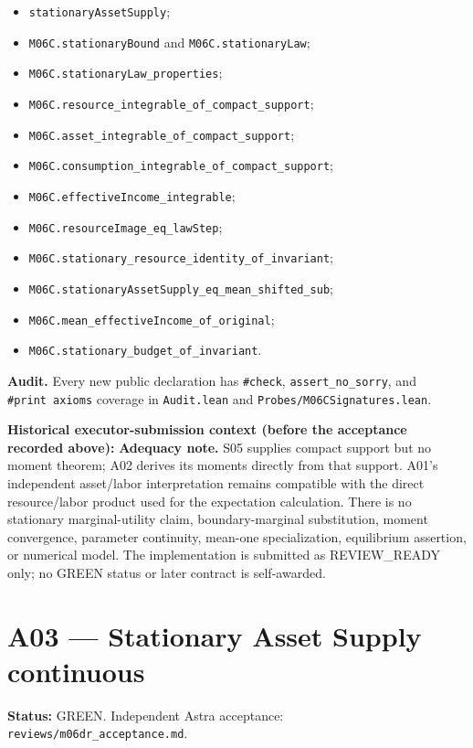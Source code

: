 \documentclass[
  11pt,
]{article}
\providecommand{\tightlist}{%
  \setlength{\itemsep}{0pt}\setlength{\parskip}{0pt}}
\let\LedgerOriginalTexttt\texttt
\renewcommand{\texttt}[1]{{\small\LedgerOriginalTexttt{#1}}}
\begin{document}
\begin{itemize}
\tightlist
\item
  \texttt{stationaryAssetSupply};
\item
  \texttt{M06C.stationaryBound} and \texttt{M06C.stationaryLaw};
\item
  \texttt{M06C.stationaryLaw\_properties};
\item
  \texttt{M06C.resource\_integrable\_of\_compact\_support};
\item
  \texttt{M06C.asset\_integrable\_of\_compact\_support};
\item
  \texttt{M06C.consumption\_integrable\_of\_compact\_support};
\item
  \texttt{M06C.effectiveIncome\_integrable};
\item
  \texttt{M06C.resourceImage\_eq\_lawStep};
\item
  \texttt{M06C.stationary\_resource\_identity\_of\_invariant};
\item
  \texttt{M06C.stationaryAssetSupply\_eq\_mean\_shifted\_sub};
\item
  \texttt{M06C.mean\_effectiveIncome\_of\_original};
\item
  \texttt{M06C.stationary\_budget\_of\_invariant}.
\end{itemize}

\textbf{Audit.} Every new public declaration has \texttt{\#check},
\texttt{assert\_no\_sorry}, and \texttt{\#print\ axioms} coverage in
\texttt{Audit.lean} and \texttt{Probes/M06CSignatures.lean}.

\textbf{Historical executor-submission context (before the acceptance
recorded above):} \textbf{Adequacy note.} S05 supplies compact support
but no moment theorem; A02 derives its moments directly from that
support. A01's independent asset/labor interpretation remains compatible
with the direct resource/labor product used for the expectation
calculation. There is no stationary marginal-utility claim,
boundary-marginal substitution, moment convergence, parameter
continuity, mean-one specialization, equilibrium assertion, or numerical
model. The implementation is submitted as REVIEW\_READY only; no GREEN
status or later contract is self-awarded.

\section{A03 --- Stationary Asset Supply
continuous}\label{a03-stationary-asset-supply-continuous}

\textbf{Status:} GREEN. Independent Astra acceptance:
\texttt{reviews/m06dr\_acceptance.md}.
\end{document}
